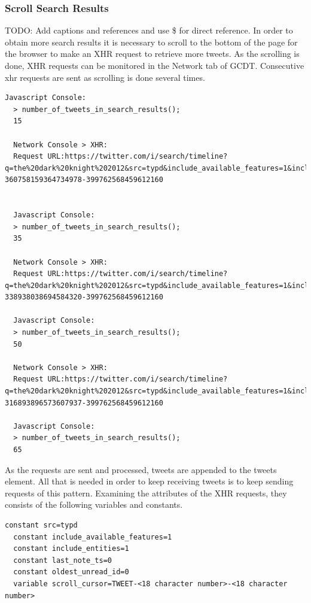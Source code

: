 \subsubsection{Scroll Search Results}
TODO: Add captions and references and use \$ for direct reference.
In order to obtain more search results it is necessary to scroll to the bottom of the page for the browser to make an XHR request to retrieve more tweets. As the scrolling is done, XHR requests can be monitored in the Network tab of GCDT. Consecutive xhr requests are sent as scrolling is done several times.

  \begin{lstlisting}[caption={TODO: Caption},label={},captionpos=b]
  Javascript Console:
  > number_of_tweets_in_search_results();
  15

  Network Console > XHR:
  Request URL:https://twitter.com/i/search/timeline?q=the%20dark%20knight%202012&src=typd&include_available_features=1&include_entities=1&last_note_ts=0&scroll_cursor=TWEET-360758159364734978-399762568459612160


  Javascript Console:
  > number_of_tweets_in_search_results();
  35

  Network Console > XHR:
  Request URL:https://twitter.com/i/search/timeline?q=the%20dark%20knight%202012&src=typd&include_available_features=1&include_entities=1&last_note_ts=0&oldest_unread_id=0&scroll_cursor=TWEET-338938038694584320-399762568459612160

  Javascript Console:
  > number_of_tweets_in_search_results();
  50

  Network Console > XHR:
  Request URL:https://twitter.com/i/search/timeline?q=the%20dark%20knight%202012&src=typd&include_available_features=1&include_entities=1&last_note_ts=0&oldest_unread_id=0&scroll_cursor=TWEET-316893896573607937-399762568459612160

  Javascript Console:
  > number_of_tweets_in_search_results();
  65
  \end{lstlisting}

As the requests are sent and processed, tweets are appended to the tweets element. All that is needed in order to keep receiving tweets is to keep sending requests of this pattern.
Examining the attributes of the XHR requests, they consists of the following variables and constants.

  \begin{lstlisting}[caption={TODO: Caption},label={},captionpos=b]
  constant src=typd
  constant include_available_features=1
  constant include_entities=1
  constant last_note_ts=0
  constant oldest_unread_id=0
  variable scroll_cursor=TWEET-<18 character number>-<18 character number>
  \end{lstlisting}

